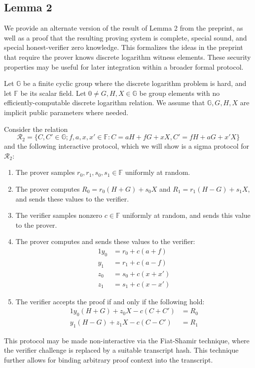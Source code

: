 \documentclass{article}
\newcommand{\G}{\mathbb{G}}
\newcommand{\F}{\mathbb{F}}
\begin{document}
\subsection{Lemma 2}
\label{obs:lemma2}

We provide an alternate version of the result of Lemma 2 from the preprint, as well as a proof that the resulting proving system is complete, special sound, and special honest-verifier zero knowledge.
This formalizes the ideas in the preprint that require the prover knows discrete logarithm witness elements.
These security properties may be useful for later integration within a broader formal protocol.

Let $\G$ be a finite cyclic group where the discrete logarithm problem is hard, and let $\F$ be its scalar field.
Let $0 \neq G,H,X \in \G$ be group elements with no efficiently-computable discrete logarithm relation.
We assume that $\G,G,H,X$ are implicit public parameters where needed.

Consider the relation
$$\mathcal{R}_2 = \{C,C' \in \G ; f,a,x,x' \in \F : C = aH + fG + xX, C' = fH + aG + x'X\}$$
and the following interactive protocol, which we will show is a sigma protocol for $\mathcal{R}_2$:
\begin{enumerate}
	\item The prover samples $r_0,r_1,s_0,s_1 \in \F$ uniformly at random.
	\item The prover computes $R_0 = r_0 (H + G) + s_0 X$ and $R_1 = r_1 (H - G) + s_1 X$, and sends these values to the verifier.
	\item The verifier samples nonzero $c \in \F$ uniformly at random, and sends this value to the prover.
	\item The prover computes and sends these values to the verifier:
		\begin{alignat*}{1}
			y_0 &= r_0 + c(a + f) \\
			y_1 &= r_1 + c(a - f) \\
			z_0 &= s_0 + c(x + x') \\
			z_1 &= s_1 + c(x - x')
		\end{alignat*}
	\item The verifier accepts the proof if and only if the following hold:
		\begin{alignat}{1}
			y_0 (H + G) + z_0 X - c(C + C') &= R_0 \label{eqn:L2_1}\\
			y_1 (H - G) + z_1 X - c(C - C') &= R_1 \label{eqn:L2_2}
		\end{alignat}
\end{enumerate}
This protocol may be made non-interactive via the Fiat-Shamir technique, where the verifier challenge is replaced by a suitable transcript hash.
This technique further allows for binding arbitrary proof context into the transcript.
\end{document}
